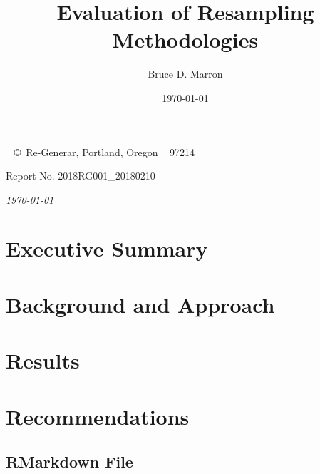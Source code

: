 \documentclass[12pt,letterpaper]{article}
\title{\textbf{Evaluation of Resampling Methodologies}}
\author{Bruce D. Marron}
\date{\today}
\begin{document}
\maketitle

\newpage
~\vfill
\thispagestyle{empty}
\noindent \copyright\ Re-Generar, Portland, Oregon ~ 97214

\noindent Report No. 2018RG001\_20180210

\noindent \textit{\today}
\clearpage

\renewcommand\contentsname{Table of Contents}	
\tableofcontents
{}
\listoffigures
\listoftables
\clearpage

\section{Executive Summary}

\section{Background and Approach}

\section{Results}

\section{Recommendations}

\begin{appendices}
\section{RMarkdown File} 
\end{appendices}

\newpage
\printbibliography
\end{document}

